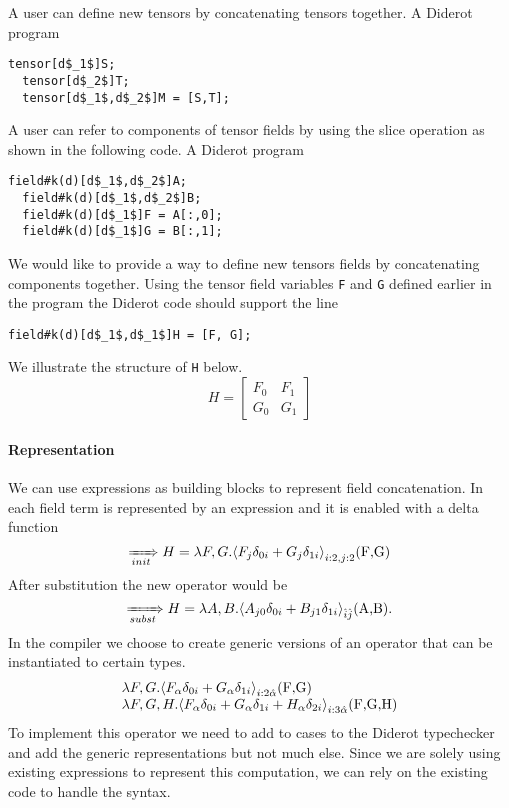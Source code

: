 
A user can define new tensors by concatenating tensors together.
A Diderot program
\begin{lstlisting}[mathescape=true]
  tensor[d$_1$]S; 
  tensor[d$_2$]T;
  tensor[d$_1$,d$_2$]M = [S,T]; 
\end{lstlisting}

A user can refer to components of tensor fields by using the slice operation as shown in the following code.
A Diderot program
\begin{lstlisting}[mathescape=true]
  field#k(d)[d$_1$,d$_2$]A; 
  field#k(d)[d$_1$,d$_2$]B;
  field#k(d)[d$_1$]F = A[:,0]; 
  field#k(d)[d$_1$]G = B[:,1];
\end{lstlisting}

We would like to provide a way to define new tensors fields by concatenating components together.
Using the tensor field variables \lstinline!F! and  \lstinline!G! defined earlier in the program the Diderot code should support the line 
\begin{lstlisting}[mathescape=true]
  field#k(d)[d$_1$,d$_1$]H = [F, G];
\end{lstlisting}

\noindent We illustrate the structure of \lstinline[mathescape=true]!H! below.  
\begin{displaymath}
  H=\left[ \begin{array}{ll}
  F_0  & F_1\\
  G_0  &G_1
  \end{array}
 \right]  
 \end{displaymath}
 
\paragraph{Representation}
We can use \name{} expressions as building blocks to represent field concatenation. 
In \name{} each field term is represented by an  expression and it is enabled with a delta function 
$$\rewriteInitA{} H=\lambda F,G.\EinExp{F_{j }\delta_{0i}+G_{j }\delta_{1i}}{i:2,j:2}\text{(\lstinline[mathescape=true]!F,G!)}$$
After substitution the new \name{} operator would be 
$$\rewriteSubst{}H=\lambda A,B.\EinExp{A_{j 0}\delta_{0i}+B_{j 1}\delta_{1i}}{\hat{i}\hat{j}}\text{(\lstinline[mathescape=true]!A,B!)}.$$
In the compiler we choose to create generic versions of an \name{} operator that can be instantiated to certain types.
$$\begin{array}{l}
\lambda F,G. \EinExp{F_{\alpha }\delta_{0i}+G_{\alpha }\delta_{1i}}{{i:2} \hat{\alpha} }\text{(\lstinline[mathescape=true]!F,G!)}\\
\lambda F,G, H.\EinExp{F_{\alpha }\delta_{0i}+G_{\alpha }\delta_{1i}+H_{\alpha }\delta_{2i}}{{i:3} \hat{\alpha} }\text{(\lstinline[mathescape=true]!F,G,H!)}
\end{array}$$
To implement this operator we  need to add to cases to the Diderot typechecker and add the generic representations but not much else.
Since we are solely using existing \name{} expressions to represent this computation, we can rely on the existing code to handle the \name{} syntax.

